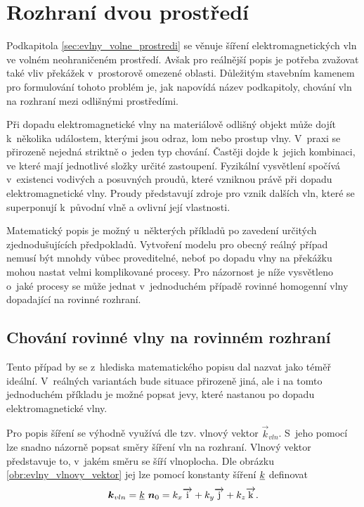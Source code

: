 \section{Rozhraní dvou prostředí} \label{sec:evlny_rozhrani_dvou_prostredi}
Podkapitola \ref{sec:evlny_volne_prostredi} se věnuje šíření elektromagnetických vln ve volném neohraničeném prostředí. Avšak pro reálnější popis je potřeba zvažovat také vliv překážek v~prostorově omezené oblasti. Důležitým stavebním kamenem pro formulování tohoto problém je, jak napovídá název podkapitoly, chování vln na rozhraní mezi odlišnými prostředími.

Při dopadu elektromagnetické vlny na materiálově odlišný objekt může dojít k~několika událostem, kterými jsou odraz, lom nebo prostup vlny. V~praxi se přirozeně nejedná striktně o~jeden typ chování. Častěji dojde k~jejich kombinaci, ve které mají jednotlivé složky určité zastoupení. Fyzikální vysvětlení spočívá v~existenci vodivých a posuvných proudů, které vzniknou právě při dopadu elektromagnetické vlny. Proudy představují zdroje pro vznik dalších vln, které se superponují k~původní vlně a ovlivní její vlastnosti. 

Matematický popis je možný u~některých příkladů po zavedení určitých zjednodušujících předpokladů. Vytvoření modelu pro obecný reálný případ nemusí být mnohdy vůbec proveditelné, neboť po dopadu vlny na překážku mohou nastat velmi komplikované procesy. Pro názornost je níže vysvětleno o~jaké procesy se může jednat v~jednoduchém případě rovinné homogenní vlny dopadající na rovinné rozhraní.

\subsection*{Chování rovinné vlny na rovinném rozhraní}
Tento případ by se z~hlediska matematického popisu dal nazvat jako téměř ideální. V~reálných variantách bude situace přirozeně jiná, ale i na tomto jednoduchém příkladu je možné popsat jevy, které nastanou po dopadu elektromagnetické vlny. 

Pro popis šíření se výhodně využívá dle \cite[str.47]{emp} tzv. vlnový vektor $\vec k_{vln}$. S~jeho pomocí lze snadno názorně popsat směry šíření vln na rozhraní. Vlnový vektor představuje to, v~jakém směru se šíří vlnoplocha. Dle obrázku \ref{obr:evlny_vlnovy_vektor} jej lze pomocí konstanty šíření ${\underline{k}}$ definovat
\begin{equation}
	\mbox{\boldmath$k$}_{vln} = {\underline{k}}~\mbox{\boldmath$n$}_{0} = k_{x}\overrightarrow{\mathrm{i}} + k_{y}\overrightarrow{\mathrm{j}} + k_{z}\overrightarrow{\mathrm{k}}.
	\label{rce:evlny_vlnovy_vektor}
\end{equation}

